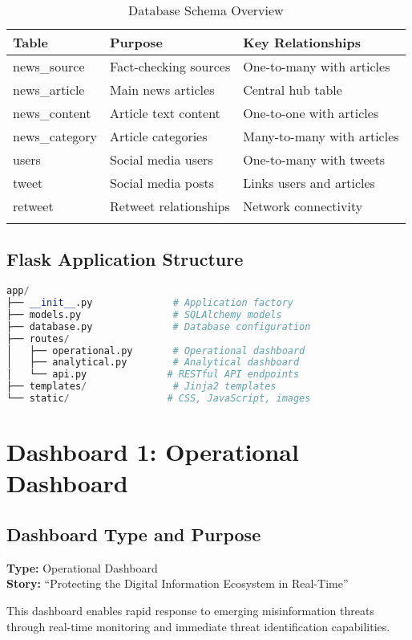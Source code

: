 \documentclass[12pt,a4paper]{article}
\begin{document}
\begin{longtable}{|p{4cm}|p{6cm}|p{4cm}|}
\hline
\textbf{Table} & \textbf{Purpose} & \textbf{Key Relationships} \\
\hline
\endhead
news\_source & Fact-checking sources & One-to-many with articles \\
news\_article & Main news articles & Central hub table \\
news\_content & Article text content & One-to-one with articles \\
news\_category & Article categories & Many-to-many with articles \\
users & Social media users & One-to-many with tweets \\
tweet & Social media posts & Links users and articles \\
retweet & Retweet relationships & Network connectivity \\
\hline
\caption{Database Schema Overview}
\end{longtable}

\subsection{Flask Application Structure}
\begin{lstlisting}[language=Python, caption=Application Structure]
app/
├── __init__.py              # Application factory
├── models.py                # SQLAlchemy models
├── database.py              # Database configuration
├── routes/
│   ├── operational.py       # Operational dashboard
│   ├── analytical.py        # Analytical dashboard
│   └── api.py              # RESTful API endpoints
├── templates/               # Jinja2 templates
└── static/                 # CSS, JavaScript, images
\end{lstlisting}

\section{Dashboard 1: Operational Dashboard}

\subsection{Dashboard Type and Purpose}
\textbf{Type:} Operational Dashboard \\
\textbf{Story:} ``Protecting the Digital Information Ecosystem in Real-Time''

This dashboard enables rapid response to emerging misinformation threats through real-time monitoring and immediate threat identification capabilities.
\end{document}
